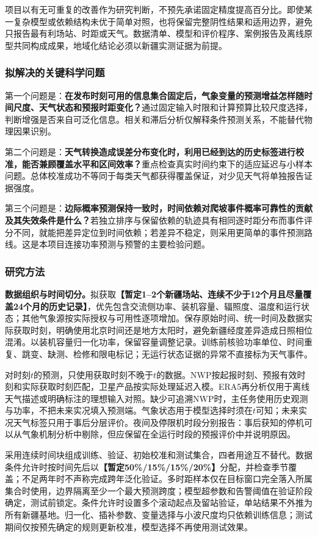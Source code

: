 项目以有无可重复的改善作为研究判断，不预先承诺固定精度提高百分比。即使某一复杂模型或依赖结构未优于简单对照，也将保留完整阴性结果和适用边界，避免只报告最有利场站、时距或天气。数据清单、模型和评价程序、案例报告及离线原型共同构成成果，地域化结论必须以新疆实测证据为前提。

\subsubsection{拟解决的关键科学问题}
第一个问题是：\textbf{在发布时刻可用的信息集合固定后，气象变量的预测增益怎样随时间尺度、天气状态和预报时距变化？}通过固定输入时限和计算预算比较尺度选择，判断增强是否来自可泛化信息。相关和滞后分析仅解释条件预测关系，不能替代物理因果识别。

第二个问题是：\textbf{天气转换造成误差分布变化时，利用已经到达的历史标签进行校准，能否兼顾覆盖水平和区间效率？}重点检查真实时间约束下的适应延迟与小样本问题。总体校准成功不等同于每类天气都获得覆盖保证，对少见天气将单独报告证据强度。

第三个问题是：\textbf{边际概率预测保持一致时，时间依赖对爬坡事件概率可靠性的贡献及其失效条件是什么？}若独立排序与保留依赖的轨迹具有相同逐时距分布而事件评分不同，就能把差异定位到时间依赖；若差异不稳定，则采用更简单的事件预测路线。这是本项目连接功率预测与预警的主要检验问题。

\subsubsection{研究方法}
\textbf{数据组织与时间切分。}拟获取\textbf{【暂定1--2个新疆场站、连续不少于12个月且尽量覆盖24个月的历史记录】}，优先包含交流侧功率、装机容量、辐照度、温度和运行状态；其他气象源按实际授权与可用性逐项增加。保存原始时间、统一时间及数据实际获取时刻，明确使用北京时间还是地方太阳时，避免新疆经度差异造成日照相位混淆。以装机容量归一化功率，保留容量调整记录。训练前核验功率单位、时间重复、跳变、缺测、检修和限电标记；无运行状态证据的异常不直接标为天气事件。

对时刻$t$的预测，只使用获取时刻不晚于$t$的数据。NWP按起报时刻、预报有效时刻和实际获取时刻匹配，卫星产品按实际处理延迟入模。ERA5再分析仅用于离线天气描述或明确标注的理想输入对照。缺少可追溯NWP时，主任务使用历史观测与功率，不把未来实况填入预测端。气象状态用于模型选择时须在$t$可知；未来实况天气标签只用于事后分层评价。夜间及停限机时段分别报告：事后获知的停机可以从气象机制分析中剔除，但应保留在全运行时段的预报评价中并说明原因。

采用连续时间块组成训练、验证、初始校准和测试集合，四者用途互不替代。数据条件允许时按时间先后以\textbf{【暂定50\%/15\%/15\%/20\%】}分配，并检查季节覆盖；不足两年时不声称完成跨年泛化验证。多时距样本仅在目标窗口完全落入所属集合时使用，边界隔离至少一个最大预测跨度；模型超参数和告警阈值在验证阶段确定，测试前锁定。条件允许时设置多个滚动起点及留站验证，单站结果不外推为所有新疆基地。归一化、插补参数、变量选择与小波尺度均只依赖训练信息；测试期间仅按预先确定的规则更新校准，模型选择不再使用测试效果。


